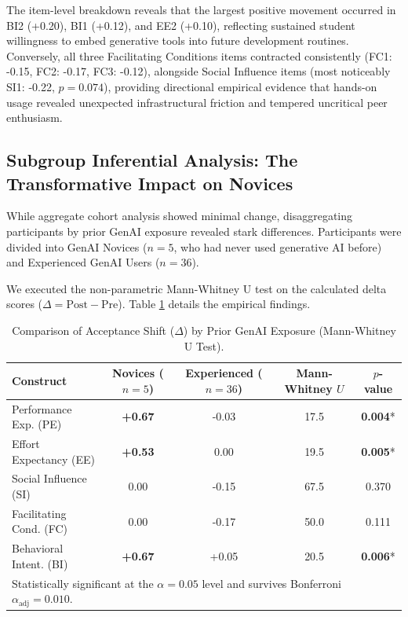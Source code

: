 \documentclass{cleiej}
\begin{document}
The item-level breakdown reveals that the largest positive movement occurred in BI2 (+0.20), BI1 (+0.12), and EE2 (+0.10), reflecting sustained student willingness to embed generative tools into future development routines. Conversely, all three Facilitating Conditions items contracted consistently (FC1: -0.15, FC2: -0.17, FC3: -0.12), alongside Social Influence items (most noticeably SI1: -0.22, $p = 0.074$), providing directional empirical evidence that hands-on usage revealed unexpected infrastructural friction and tempered uncritical peer enthusiasm.

\subsection{Subgroup Inferential Analysis: The Transformative Impact on Novices}
While aggregate cohort analysis showed minimal change, disaggregating participants by prior GenAI exposure revealed stark differences. Participants were divided into GenAI Novices ($n = 5$, who had never used generative AI before) and Experienced GenAI Users ($n = 36$).

We executed the non-parametric Mann-Whitney U test on the calculated delta scores ($\Delta = \text{Post} - \text{Pre}$). Table \ref{tab:subgroups} details the empirical findings.

\begin{table}[ht]
\centering
\caption{Comparison of Acceptance Shift ($\Delta$) by Prior GenAI Exposure (Mann-Whitney U Test).}
\label{tab:subgroups}
\small
\begin{tabular}{lcccc}
\toprule
\textbf{Construct} & \textbf{Novices ($n=5$)} & \textbf{Experienced ($n=36$)} & \textbf{Mann-Whitney $U$} & \textbf{$p$-value} \\
\midrule
Performance Exp. (PE) & \textbf{+0.67} & -0.03 & 17.5 & \textbf{0.004}* \\
Effort Expectancy (EE)& \textbf{+0.53} & 0.00  & 19.5 & \textbf{0.005}* \\
Social Influence (SI) & 0.00          & -0.15 & 67.5 & 0.370 \\
Facilitating Cond. (FC)& 0.00         & -0.17 & 50.0 & 0.111 \\
Behavioral Intent. (BI)& \textbf{+0.67} & +0.05 & 20.5 & \textbf{0.006}* \\
\bottomrule
\multicolumn{5}{l}{\footnotesize * Statistically significant at the $\alpha = 0.05$ level and survives Bonferroni $\alpha_{\text{adj}} = 0.010$.}
\end{tabular}
\end{table}
\end{document}
